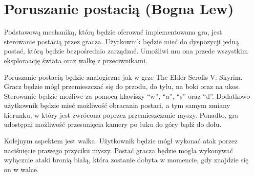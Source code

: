 \section{Poruszanie postacią (Bogna Lew)}
Podstawową mechaniką, którą będzie oferować implementowana gra, jest sterowanie postacią przez gracza. Użytkownik będzie
mieć do dyspozycji jedną postać, którą będzie bezpośrednio zarządzać. Umożliwi mu ona przede wszystkim eksploraację
świata oraz walkę z przeciwnikami.

Poruszanie postacią będzie analogiczne jak w grze The Elder Scrolls V: Skyrim. Gracz będzie mógł przemieszczać się
do przodu, do tyłu, na boki oraz na ukos. Sterowanie będzie możliwe za pomocą klawiszy  “w”, “a”, “s” oraz “d”.
Dodatkowo użytkownik będzie mieć możliwość obracania postaci, a tym samym zmiany kierunku, w który jest zwrócona poprzez
przemieszczanie myszy. Ponadto, gra udostępni możliwość przesunięcia kamery po łuku do góry bądź do dołu.

Kolejnym aspektem jest walka. Użytkownik będzie mógł wykonać atak porzez naciśnięcie prawego przyciku myszy. Postać
gracza będzie mogła wykonywać wyłącznie ataki bronią białą, która zostanie dobyta w momencie, gdy znajdzie się on w walce.